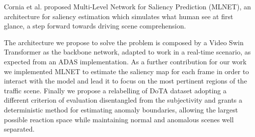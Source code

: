 
Cornia et al.\cite{cornia2016saliency} proposed Multi-Level Network for Saliency Prediction (MLNET), an architecture for saliency estimation which simulates what human see at first glance, a step forward towards driving scene comprehension.

The architecture we propose to solve the problem is composed by a Video Swin Transformer \cite{liu_video_2022} as the backbone network, adapted to work in a real-time scenario, as expected from an ADAS implementation. %
As a further contribution for our work we implemented MLNET to estimate the saliency map for each frame in order to interact with the model and lead it to focus on the most pertinent regions of the traffic scene.
Finally we propose a relabelling of DoTA dataset adopting a different criterion of evaluation disentangled from the subjectivity and grants a deterministic method for estimating anomaly boundaries, allowing the largest possible reaction space while maintaining normal and anomalous scenes well separated.